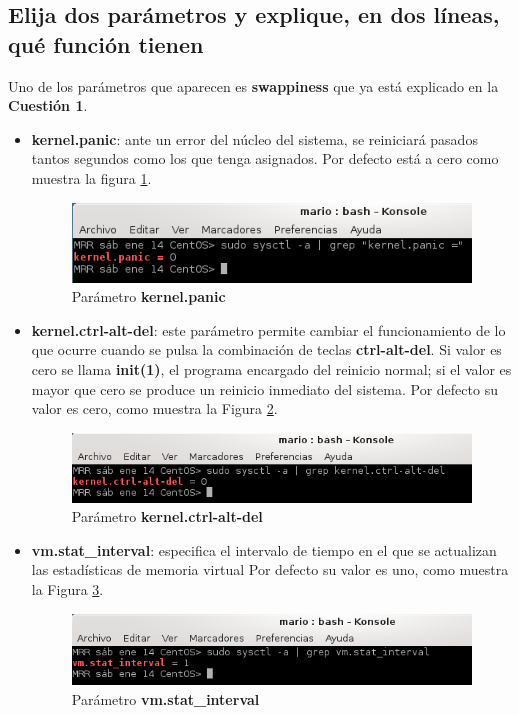 \subsection{Elija dos parámetros y explique, en
	dos líneas, qué función tienen}
Uno de los parámetros que aparecen es \textbf{swappiness}\cite{enlace3} que ya está explicado en la \textbf{Cuestión 1}.

\begin{itemize}
	\item \textbf{kernel.panic}\cite{enlace4}: ante un error del
	núcleo del sistema, se reiniciará pasados tantos segundos como los que tenga asignados. Por defecto está a cero como muestra la figura \ref{fig:figura2-2}.
		\begin{figure}[H] %
			\centering
			\includegraphics[scale=1]{figuras/ejercicio2/figura2-2.png} 
			\caption{Parámetro \textbf{kernel.panic}} 
			\label{fig:figura2-2}
		\end{figure}
	\item \textbf{kernel.ctrl-alt-del}\cite{enlace5}: este parámetro permite cambiar el funcionamiento de lo que ocurre cuando se pulsa la combinación de teclas \textbf{ctrl-alt-del}. Si valor es cero se llama \textbf{init(1)}, el programa encargado del reinicio
	normal; si el valor es mayor que cero se produce un reinicio inmediato del sistema.
	Por defecto su valor es cero, como muestra la Figura \ref{fig:figura2-3}.
		\begin{figure}[H] %
			\centering
			\includegraphics[scale=0.9]{figuras/ejercicio2/figura2-3.png} 
			\caption{Parámetro \textbf{kernel.ctrl-alt-del}} 
			\label{fig:figura2-3}
		\end{figure}
	\item \textbf{vm.stat\_interval}\cite{enlace6}: especifica el intervalo de tiempo en el que se actualizan las estadísticas de memoria virtual
	Por defecto su valor es uno, como muestra la Figura \ref{fig:figura2-4}.
	\begin{figure}[H] %
		\centering
		\includegraphics[scale=0.9]{figuras/ejercicio2/figura2-4.png} 
		\caption{Parámetro \textbf{vm.stat\_interval}} 
		\label{fig:figura2-4}
	\end{figure}
\end{itemize}

